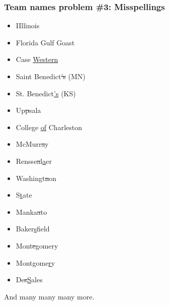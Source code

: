 \documentclass{beamer}
\begin{document}
\begin{frame}
\frametitle{Team names problem \#3: Misspellings}
\begin{multicols}{2}
\begin{itemize}
\item IIllinois
\item Florida Gulf Goast
\item Case \underline{Western}
\item Saint Benedict\sout{'s} (MN)
\item St. Benedict\underline{'s} (KS)
\item Up\sout psala
\item College \underline{of} Charleston
\item McMurr\sout ay
\item Rensse\sout al\underline aer
\item Washingt\sout non
\item S\underline tate
\item Manka\sout ato
\item Baker\underline sfield
\item Mont\sout egomery
\item Montgome\underline ry
\item De\sout s\underline Sales
\end{itemize}
\end{multicols}
And many many many more.
\end{frame}
\end{document}
